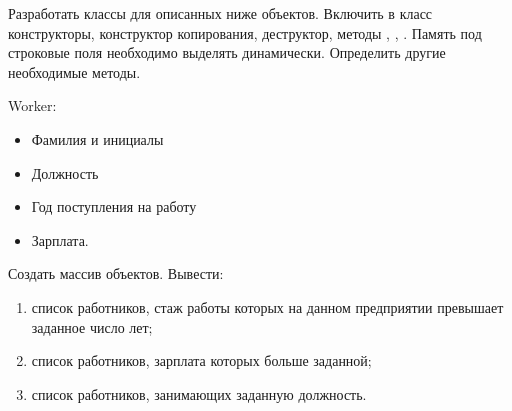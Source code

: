 
Разработать классы для описанных ниже объектов. Включить в класс
конструкторы, конструктор копирования, деструктор, методы ,
, . Память под строковые поля необходимо выделять
динамически. Определить другие необходимые методы.

Worker:
\begin{itemize}
	\item Фамилия и инициалы
	\item Должность
	\item Год поступления на работу
	\item Зарплата.
\end{itemize}

Создать массив объектов. Вывести:
\begin{enumerate}
	\item список работников, стаж работы которых на данном предприятии превышает заданное число лет;
	\item список работников, зарплата которых больше заданной;
	\item список работников, занимающих заданную должность.
\end{enumerate}
